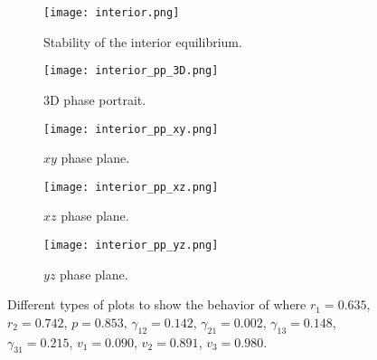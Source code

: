 \begin{figure}[H]
    \centering
    \begin{subfigure}[b]{0.49\textwidth}
        \centering
        \texttt{[image: interior.png]}
        \caption{Stability of the interior equilibrium.}
        \label{fig:interior}
    \end{subfigure}
    \hfill
    \begin{subfigure}[b]{0.49\textwidth}
        \centering
        \texttt{[image: interior\_pp\_3D.png]}
        \caption{3D phase portrait.}
        \label{fig:phase_plane_3d}
    \end{subfigure}
    \hfill
    \begin{subfigure}[b]{0.49\textwidth}
        \centering
        \texttt{[image: interior\_pp\_xy.png]}
        \caption{$xy$ phase plane.}
        \label{fig:phase_plane_xy}
    \end{subfigure}
    \hfill
    \begin{subfigure}[b]{0.49\textwidth}
        \centering
        \texttt{[image: interior\_pp\_xz.png]}
        \caption{$xz$ phase plane.}
        \label{fig:phase_plane_xz}
    \end{subfigure}
    \hfill
    \begin{subfigure}[b]{0.49\textwidth}
        \centering
        \texttt{[image: interior\_pp\_yz.png]}
        \caption{$yz$ phase plane.}
        \label{fig:phase_plane_yz}
    \end{subfigure}
       \caption{Different types of plots to show the behavior of  where $r_1 = 0.635$, $r_2 = 0.742$, $p = 0.853$, $\gamma_{12} = 0.142$, $\gamma_{21} = 0.002$, $\gamma_{13} = 0.148$, $\gamma_{31} = 0.215$, $v_1 = 0.090$, $v_2 = 0.891$, $v_3 = 0.980$.}
       \label{fig:nontrivial-equilibria-plots}
\end{figure}
